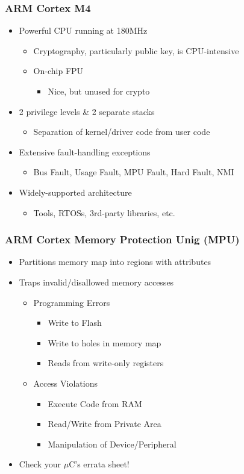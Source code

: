 \subsubsection{ARM Cortex M4}
\begin{itemize}
  \item Powerful CPU running at 180MHz
  \begin{itemize}
    \item Cryptography, particularly public key, is CPU-intensive
    \item On-chip FPU
    \begin{itemize}
      \item Nice, but unused for crypto
    \end{itemize}
  \end{itemize}
  \item 2 privilege levels \& 2 separate stacks
  \begin{itemize}
    \item Separation of kernel/driver code from user code
  \end{itemize}
  \item Extensive fault-handling exceptions
  \begin{itemize}
    \item Bus Fault, Usage Fault, MPU Fault, Hard Fault, NMI
  \end{itemize}
  \item Widely-supported architecture
  \begin{itemize}
    \item Tools, RTOSs, 3rd-party libraries, etc.
  \end{itemize}
\end{itemize}

\subsubsection{ARM Cortex Memory Protection Unig (MPU)}
\begin{itemize}
  \item Partitions memory map into regions with attributes
  \item Traps invalid/disallowed memory accesses
  \begin{itemize}
    \item Programming Errors
    \begin{itemize}
      \item Write to Flash
      \item Write to holes in memory map
      \item Reads from write-only registers
    \end{itemize}
    \item Access Violations
    \begin{itemize}
      \item Execute Code from RAM
      \item Read/Write from Private Area
      \item Manipulation of Device/Peripheral
    \end{itemize}
  \end{itemize}
  \item Check your $\mu$C's errata sheet!
\end{itemize}


